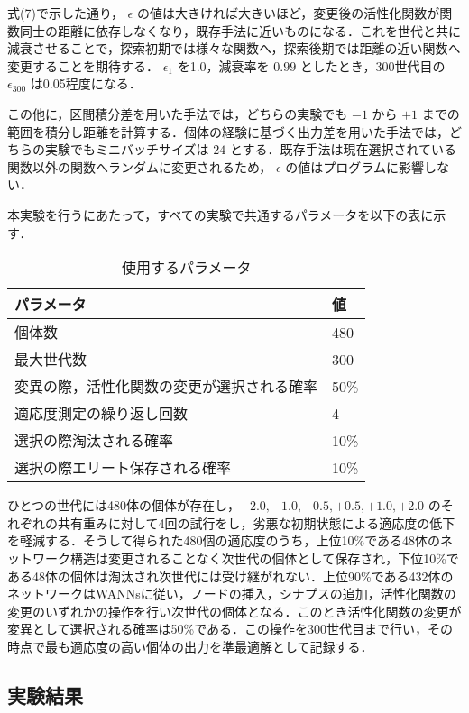 式(7)で示した通り， $ \epsilon $ の値は大きければ大きいほど，変更後の活性化関数が関数同士の距離に依存しなくなり，既存手法に近いものになる．これを世代と共に減衰させることで，探索初期では様々な関数へ，探索後期では距離の近い関数へ変更することを期待する． $ \epsilon_1 $ を1.0，減衰率を $ 0.99 $ としたとき，300世代目の $ \epsilon_300 $ は0.05程度になる．

この他に，区間積分差を用いた手法では，どちらの実験でも $ -1 $ から $ +1 $ までの範囲を積分し距離を計算する．個体の経験に基づく出力差を用いた手法では，どちらの実験でもミニバッチサイズは $ 24 $ とする．既存手法は現在選択されている関数以外の関数へランダムに変更されるため， $ \epsilon $ の値はプログラムに影響しない．

本実験を行うにあたって，すべての実験で共通するパラメータを以下の表に示す．

\begin{table}[h]
    \caption{使用するパラメータ}
    \centering
    \begin{tabular}{ll}
        \hline
        パラメータ & 値 \\
        \hline \hline
        個体数 & 480 \\
        最大世代数 & 300 \\
        変異の際，活性化関数の変更が選択される確率 & 50\% \\
        適応度測定の繰り返し回数 & 4 \\
        選択の際淘汰される確率 & 10\% \\
        選択の際エリート保存される確率 & 10\% \\
        \hline
    \end{tabular}
\end{table}

ひとつの世代には480体の個体が存在し，$ -2.0, -1.0, -0.5, +0.5, +1.0, +2.0$ のそれぞれの共有重みに対して4回の試行をし，劣悪な初期状態による適応度の低下を軽減する．そうして得られた480個の適応度のうち，上位10\%である48体のネットワーク構造は変更されることなく次世代の個体として保存され，下位10\%である48体の個体は淘汰され次世代には受け継がれない．上位90\%である432体のネットワークはWANNsに従い，ノードの挿入，シナプスの追加，活性化関数の変更のいずれかの操作を行い次世代の個体となる．このとき活性化関数の変更が変異として選択される確率は50\%である．この操作を300世代目まで行い，その時点で最も適応度の高い個体の出力を準最適解として記録する．

\subsection{実験結果}
